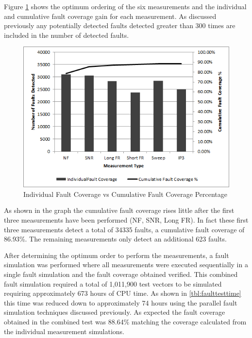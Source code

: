 \documentclass[12pt]{report}
\begin{document}
Figure \ref{fig:cumulativefault} shows the optimum ordering of the six measurements and the individual and cumulative fault coverage gain for each measurement.  As discussed previously any potentially detected faults detected greater than 300 times are included in the number of detected faults.
\begin{figure}
  \begin{center}
		\includegraphics[scale=.9]{images/faultcvg-graph}
  \end{center}
  \caption{Individual Fault Coverage vs Cumulative Fault Coverage Percentage}
  \label{fig:cumulativefault}
\end{figure}
As shown in the graph the cumulative fault coverage rises little after the first three measurements have been performed (NF, SNR, Long FR).  In fact these first three measurements detect a total of 34335 faults, a cumulative fault coverage of 86.93\%.  The remaining measurements only detect an additional 623 faults. 

After determining the optimum order to perform the measurements, a fault simulation was performed where all measurements were executed sequentially in a single fault simulation and the fault coverage obtained verified.  This combined fault simulation required a total of 1,011,900 test vectors to be simulated requiring approximately 673 hours of CPU time.  As shown in \ref{tbl:faulttesttime} this time was reduced down to approximately 74 hours using the parallel fault simulation techniques discussed previously.  As expected the fault coverage obtained in the combined test was 88.64\% matching the coverage calculated from the individual measurement simulations.
\end{document}
